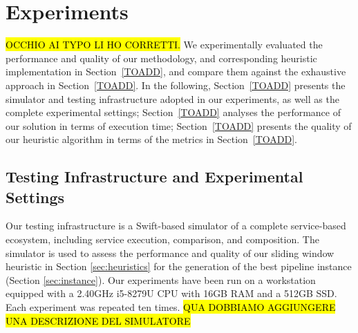 \section{Experiments}\label{sec:experiment}

\hl{OCCHIO AI TYPO LI HO CORRETTI.}
We experimentally evaluated the performance and quality of our methodology, and corresponding heuristic implementation in Section~\ref{TOADD}, and compare them against the exhaustive approach in Section~\ref{TOADD}.
In the following, Section~\ref{TOADD} presents the simulator and testing infrastructure adopted in our experiments, as well as the complete experimental settings; Section~\ref{TOADD} analyses the performance of our solution in terms of execution time; Section~\ref{TOADD} presents the quality of our heuristic algorithm in terms of the metrics in Section~\ref{TOADD}.

\subsection{Testing Infrastructure and Experimental Settings}
Our testing infrastructure is a Swift-based simulator of a complete service-based ecosystem, including service execution, comparison, and composition.
The simulator is used to assess the performance and quality of our sliding window heuristic in Section \ref{sec:heuristics} for the generation of the best pipeline instance (Section \ref{sec:instance}).
Our experiments have been run on a workstation equipped with a 2.40GHz i5-8279U CPU with 16GB RAM and a 512GB SSD.
Each experiment was repeated ten times. \hl{QUA DOBBIAMO AGGIUNGERE UNA DESCRIZIONE DEL SIMULATORE}

\usetikzlibrary{positioning}
\usetikzlibrary{backgrounds}

